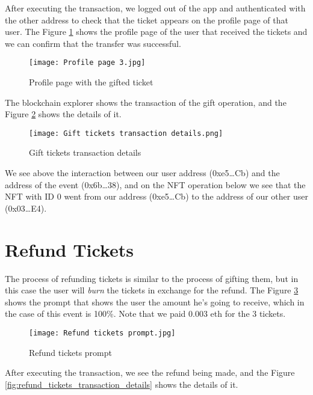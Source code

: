 After executing the transaction, we logged out of the app and authenticated
with the other address to check that the ticket appears on the profile page of
that user. The Figure \ref{fig:profile_page_3} shows the profile page of the
user that received the tickets and we can confirm that the transfer was
successful.

\begin{figure}[H]
    \texttt{[image: Profile page 3.jpg]}
    \centering
    \caption{Profile page with the gifted ticket}
    \label{fig:profile_page_3}
\end{figure}

The blockchain explorer shows the transaction of the gift operation, and the
Figure \ref{fig:gift_tickets_transaction_details} shows the details of it.

\begin{figure}[H]
    \texttt{[image: Gift tickets transaction details.png]}
    \centering
    \caption{Gift tickets transaction details}
    \label{fig:gift_tickets_transaction_details}
\end{figure}

We see above the interaction between our user address (0xe5{\dots}Cb) and the
address of the event (0x6b\dots38), and on the NFT operation below we see that
the NFT with ID 0 went from our address (0xe5{\dots}Cb) to the address of our
other user (0x03{\dots}E4).

\section{Refund Tickets}
\label{sec:refund_tickets}

The process of refunding tickets is similar to the process of gifting them, but
in this case the user will \textit{burn} the tickets in exchange for the
refund. The Figure \ref{fig:refund_tickets_prompt} shows the prompt that shows
the user the amount he's going to receive, which in the case of this event is
100\%. Note that we paid 0.003 eth for the 3 tickets.

\begin{figure}[H]
    \texttt{[image: Refund tickets prompt.jpg]}
    \centering
    \caption{Refund tickets prompt}
    \label{fig:refund_tickets_prompt}
\end{figure}

After executing the transaction, we see the refund being made, and the Figure
\ref{fig:refund_tickets_transaction_details} shows the details of it.

